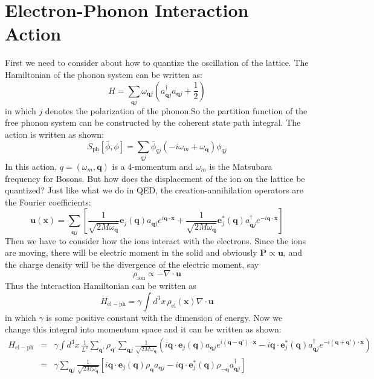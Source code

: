 \documentclass{article}
\newcommand{\mtq}{\mathbf{q}}
\newcommand{\pnx}{\mathbf{x}}
\begin{document}
\section{Electron-Phonon Interaction Action}
First we need to consider about how to quantize the oscillation of the lattice. The Hamiltonian of the phonon system can be written as:
$$
H = \sum_{\mtq  j} \omega_{\mtq j} \left(a^\dagger_{\mtq j}a_{\mtq j}+\frac{1}{2}\right)
$$
in which $ j$ denotes the polarization of the phonon.So the partition function of the free phonon system can be constructed by the coherent state path integral. The action is written as shown:
\begin{equation}
S_{\mathrm{ph}}[\bar{\phi},\phi] = \sum_{qj}\bar{\phi}_{q j}\left(-i\omega_m + \omega_\mtq\right)\phi_{q j}
\end{equation}
In this action, $q = (\omega_m,\mtq)$ is a 4-momentum and $\omega_m$ is the Matsubara frequency for Bosons. But how does the displacement of the ion on the lattice be quantized? Just like what we do in QED, the creation-annihilation operators are the Fourier coefficients:
\begin{equation}
\mathbf{u}(\mathbf{x}) = \sum_{\mtq j}\left[\frac{1}{\sqrt{2M\omega_\mtq}}\mathbf{e}_j(\mtq)a_{\mtq j}e^{i\mtq\cdot\pnx} + \frac{1}{\sqrt{2M\omega_\mtq}}\mathbf{e}^*_j(\mtq)a^\dagger_{\mtq j}e^{-i\mtq\cdot\pnx}\right]
\end{equation}
Then we have to consider how the ions interact with the electrons. Since the ions are moving, there will be electric moment in the solid and obviously $\mathbf{P}\propto \mathbf{u}$, and the charge density will be the divergence of the electric moment, say
$$
\rho_{\mathrm{ion}} \propto -\nabla \cdot \mathbf{u}
$$ 
Thus the interaction Hamiltonian can be written as
$$
H_{\mathrm{el-ph}} = \gamma \int d^3x \,\rho_{\mathrm{el}}(\mathbf{x}) \nabla\cdot\mathbf{u}
$$
in which $\gamma$ is some positive constant with the dimension of energy. Now we change this integral into momentum space and it can be written as shown:
\begin{eqnarray}
H_{\mathrm{el-ph}} & = & \gamma\int d^3x\, \frac{1}{L^3} \sum_{\mtq'}\rho_{\mtq'}\sum_{\mtq j}\frac{1}{\sqrt{2M\omega_{\mtq}}}\left(i\mtq \cdot \mathbf{e}_j(\mtq)a_{\mtq j}e^{i(\mtq-\mtq')\cdot \pnx} - i\mtq \cdot \mathbf{e}_j^*(\mtq)a^\dagger_{\mtq j}e^{-i(\mtq+\mtq')\cdot\pnx}\right)\nonumber\\ 
&=& \gamma \sum_{\mtq j} \frac{1}{\sqrt{2M\omega_\mtq}}\left[i\mtq \cdot \mathbf{e}_j(\mtq)\rho_\mtq a_{\mtq j}-i\mtq \cdot \mathbf{e}_j^*(\mtq)\rho_{-\mtq}a^\dagger_{\mtq j}\right]
\end{eqnarray}
\end{document}
